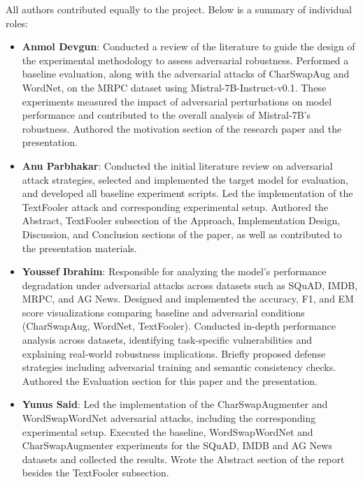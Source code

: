 \documentclass[conference]{IEEEtran}
\begin{document}
All authors contributed equally to the project. Below is a summary of individual roles:

\begin{itemize}
    \item \textbf{Anmol Devgun}: Conducted a review of the literature to guide the design of the experimental methodology to assess adversarial robustness. Performed a baseline evaluation, along with the adversarial attacks of CharSwapAug and WordNet, on the MRPC dataset using Mistral-7B-Instruct-v0.1. These experiments measured the impact of adversarial perturbations on model performance and contributed to the overall analysis of Mistral-7B's robustness. Authored the motivation section of the research paper and the presentation.
    
    \item \textbf{Anu Parbhakar}: Conducted the initial literature review on adversarial attack strategies, selected and implemented the target model for evaluation, and developed all baseline experiment scripts. Led the implementation of the TextFooler attack and corresponding experimental setup. Authored the Abstract, TextFooler subsection of the Approach, Implementation Design, Discussion, and Conclusion sections of the paper, as well as contributed to the presentation materials.
 
    \item \textbf{Youssef Ibrahim}: Responsible for analyzing the model’s performance degradation under adversarial attacks across datasets such as SQuAD, IMDB, MRPC, and AG News. Designed and implemented the accuracy, F1, and EM score visualizations comparing baseline and adversarial conditions (CharSwapAug, WordNet, TextFooler). Conducted in-depth performance analysis across datasets, identifying task-specific vulnerabilities and explaining real-world robustness implications. Briefly proposed defense strategies including adversarial training and semantic consistency checks. Authored the Evaluation section for this paper and the presentation.

    \item \textbf{Yunus Said}: Led the implementation of the CharSwapAugmenter and WordSwapWordNet adversarial attacks, including the corresponding experimental setup. Executed the baseline, WordSwapWordNet and CharSwapAugmenter experiments for the SQuAD, IMDB and AG News datasets and collected the results. Wrote the Abstract section of the report besides the TextFooler subsection.
\end{itemize}




\end{document}
